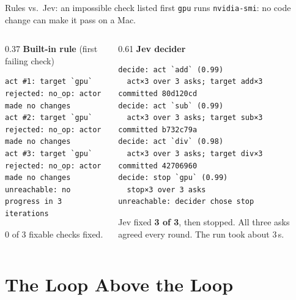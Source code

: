\documentclass[aspectratio=169]{beamer}
\begin{document}
\begin{frame}[fragile]{Rules vs.\ Jev: an impossible check listed first}
  \texttt{gpu} runs \texttt{nvidia-smi}: no code change can make it pass on a Mac.
  \begin{columns}[T]
    \begin{column}{0.37\textwidth}
      \textbf{Built-in rule} (first failing check)
\begin{lstlisting}[style=termsm]
act #1: target `gpu`
rejected: no_op: actor made no changes
act #2: target `gpu`
rejected: no_op: actor made no changes
act #3: target `gpu`
rejected: no_op: actor made no changes
unreachable: no progress in 3 iterations
\end{lstlisting}
      \small\alert{0 of 3 fixable checks fixed.}
    \end{column}
    \begin{column}{0.61\textwidth}
      \textbf{Jev decider}
\begin{lstlisting}[style=termsm]
decide: act `add` (0.99)
  act×3 over 3 asks; target add×3
committed 80d120cd
decide: act `sub` (0.99)
  act×3 over 3 asks; target sub×3
committed b732c79a
decide: act `div` (0.98)
  act×3 over 3 asks; target div×3
committed 42706960
decide: stop `gpu` (0.99)
  stop×3 over 3 asks
unreachable: decider chose stop
\end{lstlisting}
      \small Jev fixed \textbf{3 of 3}, then stopped. All three asks agreed every round. The run took about 3\,s.
    \end{column}
  \end{columns}
\end{frame}

\section[Outer loop]{The Loop Above the Loop}
\end{document}
